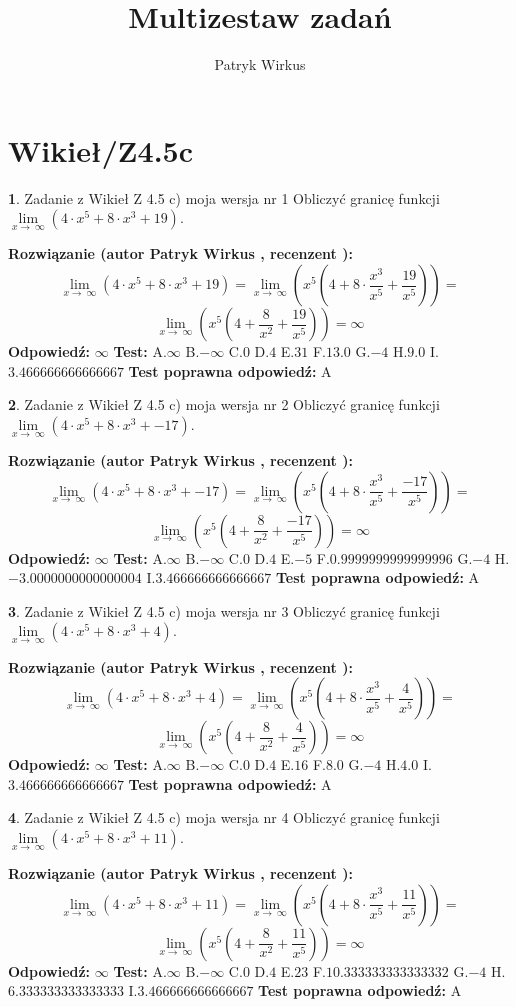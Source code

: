 \documentclass[12pt, a4paper]{article}
\title{Multizestaw zadań}
\author{Patryk Wirkus}
\date{}
\theoremstyle{definition} %
\newtheorem{zad}{}
\newcommand{\kategoria}[1]{\section{#1}}
\newcommand{\zadStart}[1]{\begin{zad}#1\newline}
\newcommand{\zadStop}{\end{zad}}
\newcommand{\rozwStart}[2]{\noindent \textbf{Rozwiązanie (autor #1 , recenzent #2): }\newline}
\newcommand{\rozwStop}{\newline}
\newcommand{\odpStart}{\noindent \textbf{Odpowiedź:}\newline}
\newcommand{\odpStop}{\newline}
\newcommand{\testStart}{\noindent \textbf{Test:}\newline}
\newcommand{\testStop}{\newline}
\newcommand{\kluczStart}{\noindent \textbf{Test poprawna odpowiedź:}\newline}
\newcommand{\kluczStop}{\newline}
\begin{document}
\maketitle

\kategoria{Wikieł/Z4.5c}


\zadStart{Zadanie z Wikieł Z 4.5 c) moja wersja nr 1}
Obliczyć granicę funkcji  $\lim\limits_{x\to\ \infty}(4 \cdot x^{5}+8 \cdot x^{3}+19)$.
\zadStop
\rozwStart{Patryk Wirkus}{}
$$\lim\limits_{x\to\ \infty}(4 \cdot x^{5}+8 \cdot x^{3}+19) = \lim\limits_{x\to\ \infty}(x^{5}(4 +8 \cdot \frac{x^{3}}{x^{5}}+\frac{19}{x^{5}})) =$$ $$\lim\limits_{x\to\ \infty}(x^{5}(4 +\frac{8}{x^{2}}+\frac{19}{x^{5}})) =\infty$$
\rozwStop
\odpStart
$\infty$
\odpStop
\testStart
A.$\infty$ B.$-\infty$ C.$0$ D.$4$ E.$31$
F.$13.0$ G.$-4$
H.$9.0$
I.$3.466666666666667$
\testStop
\kluczStart
A
\kluczStop



\zadStart{Zadanie z Wikieł Z 4.5 c) moja wersja nr 2}
Obliczyć granicę funkcji  $\lim\limits_{x\to\ \infty}(4 \cdot x^{5}+8 \cdot x^{3}+-17)$.
\zadStop
\rozwStart{Patryk Wirkus}{}
$$\lim\limits_{x\to\ \infty}(4 \cdot x^{5}+8 \cdot x^{3}+-17) = \lim\limits_{x\to\ \infty}(x^{5}(4 +8 \cdot \frac{x^{3}}{x^{5}}+\frac{-17}{x^{5}})) =$$ $$\lim\limits_{x\to\ \infty}(x^{5}(4 +\frac{8}{x^{2}}+\frac{-17}{x^{5}})) =\infty$$
\rozwStop
\odpStart
$\infty$
\odpStop
\testStart
A.$\infty$ B.$-\infty$ C.$0$ D.$4$ E.$-5$
F.$0.9999999999999996$ G.$-4$
H.$-3.0000000000000004$
I.$3.466666666666667$
\testStop
\kluczStart
A
\kluczStop



\zadStart{Zadanie z Wikieł Z 4.5 c) moja wersja nr 3}
Obliczyć granicę funkcji  $\lim\limits_{x\to\ \infty}(4 \cdot x^{5}+8 \cdot x^{3}+4)$.
\zadStop
\rozwStart{Patryk Wirkus}{}
$$\lim\limits_{x\to\ \infty}(4 \cdot x^{5}+8 \cdot x^{3}+4) = \lim\limits_{x\to\ \infty}(x^{5}(4 +8 \cdot \frac{x^{3}}{x^{5}}+\frac{4}{x^{5}})) =$$ $$\lim\limits_{x\to\ \infty}(x^{5}(4 +\frac{8}{x^{2}}+\frac{4}{x^{5}})) =\infty$$
\rozwStop
\odpStart
$\infty$
\odpStop
\testStart
A.$\infty$ B.$-\infty$ C.$0$ D.$4$ E.$16$
F.$8.0$ G.$-4$
H.$4.0$
I.$3.466666666666667$
\testStop
\kluczStart
A
\kluczStop



\zadStart{Zadanie z Wikieł Z 4.5 c) moja wersja nr 4}
Obliczyć granicę funkcji  $\lim\limits_{x\to\ \infty}(4 \cdot x^{5}+8 \cdot x^{3}+11)$.
\zadStop
\rozwStart{Patryk Wirkus}{}
$$\lim\limits_{x\to\ \infty}(4 \cdot x^{5}+8 \cdot x^{3}+11) = \lim\limits_{x\to\ \infty}(x^{5}(4 +8 \cdot \frac{x^{3}}{x^{5}}+\frac{11}{x^{5}})) =$$ $$\lim\limits_{x\to\ \infty}(x^{5}(4 +\frac{8}{x^{2}}+\frac{11}{x^{5}})) =\infty$$
\rozwStop
\odpStart
$\infty$
\odpStop
\testStart
A.$\infty$ B.$-\infty$ C.$0$ D.$4$ E.$23$
F.$10.333333333333332$ G.$-4$
H.$6.333333333333333$
I.$3.466666666666667$
\testStop
\kluczStart
A
\kluczStop
\end{document}

